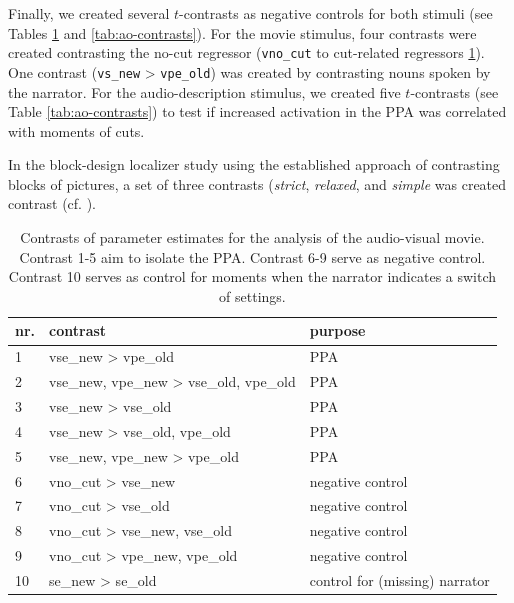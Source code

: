 \documentclass[english]{article}
\begin{document}
Finally, we created several $t$-contrasts as negative controls for both stimuli
(see Tables \ref{tab:av-contrasts} and \ref{tab:ao-contrasts}).
For the movie stimulus, four contrasts were created contrasting the no-cut
regressor (\texttt{vno\_cut} to cut-related regressors \ref{tab:av-contrasts}).
One contrast (\texttt{vs\_new} > \texttt{vpe\_old}) was created by contrasting
nouns spoken by the narrator.
For the audio-description stimulus, we created five $t$-contrasts (see Table
\ref{tab:ao-contrasts}) to test if increased activation in the PPA was
correlated with moments of cuts.

In the block-design localizer study using the established approach of contrasting blocks of
pictures, a set of three contrasts (\textit{strict}, \textit{relaxed}, and
\textit{simple} was created contrast (cf. \citep{sengupta2016extension}).


\begin{table}[h!]
\caption{Contrasts of parameter estimates for the analysis of the
    audio-visual movie.
    Contrast 1-5 aim to isolate the PPA.
    Contrast 6-9 serve as negative control.
    Contrast 10 serves as control for moments when the narrator indicates
    a switch of settings.}
\label{tab:av-contrasts}
\footnotesize
\begin{tabular}{lll}
\toprule
\textbf{nr.} &  \textbf{contrast} & \textbf{purpose} \\
\midrule
1 & vse\_new > vpe\_old & PPA \tabularnewline
2 & vse\_new, vpe\_new > vse\_old, vpe\_old & PPA \tabularnewline
3 & vse\_new > vse\_old & PPA \tabularnewline
4 & vse\_new > vse\_old, vpe\_old & PPA \tabularnewline
5 & vse\_new, vpe\_new > vpe\_old & PPA \tabularnewline
6 & vno\_cut > vse\_new & negative control \tabularnewline
7 & vno\_cut > vse\_old & negative control \tabularnewline
8 & vno\_cut > vse\_new, vse\_old & negative control \tabularnewline
9 & vno\_cut > vpe\_new, vpe\_old & negative control \tabularnewline
10 & se\_new > se\_old & control for (missing) narrator \tabularnewline
\end{tabular}
\end{table}
\end{document}
